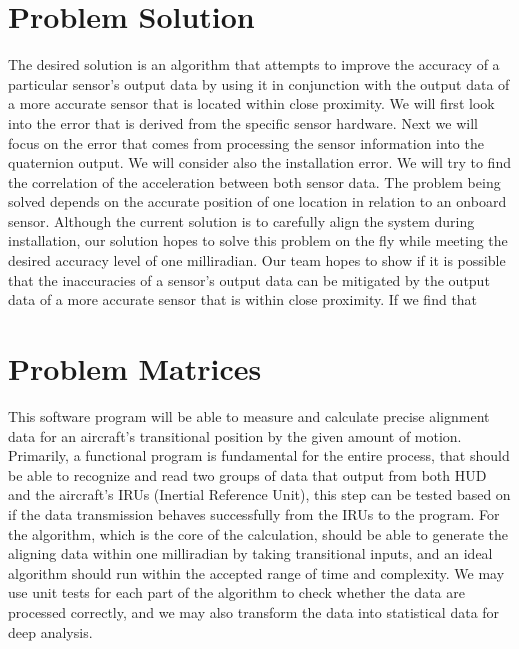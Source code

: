 \documentclass[letterpaper,10pt,titlepage]{article}
\begin{document}
\section*{Problem Solution}
The desired solution is an algorithm that attempts to improve the accuracy of a particular sensor’s output data by using it in conjunction with the output data of a more accurate sensor that is located within close proximity. We will first look into the error that is derived from the specific sensor hardware. Next we will focus on the error that comes from processing the sensor information into the quaternion output. We will consider also the installation error. We will try to find the correlation of the acceleration between both sensor data. The problem being solved depends on the accurate position of one location in relation to an onboard sensor. Although the current solution is to carefully align the system during installation, our solution hopes to solve this problem on the fly while meeting the desired accuracy level of one milliradian. Our team hopes to show if it is possible that the inaccuracies of a sensor's output data can be mitigated by the output data of a more accurate sensor that is within close proximity. If we find that 

\section*{Problem Matrices}
This software program will be able to measure and calculate precise alignment data for an aircraft’s transitional position by the given amount of motion. Primarily, a functional program is fundamental for the entire process, that should be able to recognize and read two groups of data that output from both HUD and the aircraft’s IRUs (Inertial Reference Unit), this step can be tested based on if the data transmission behaves successfully from the IRUs to the program. For the algorithm, which is the core of the calculation, should be able to generate the aligning data within one milliradian by taking transitional inputs, and an ideal algorithm should run within the accepted range of time and complexity. We may use unit tests for each part of the algorithm to check whether the data are processed correctly, and we may also transform the data into statistical data for deep analysis. 
\end{document}
